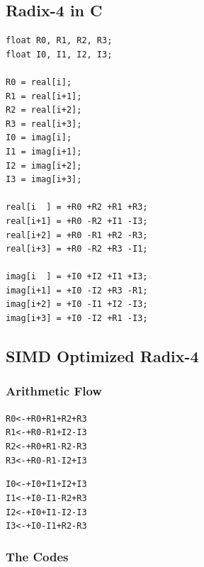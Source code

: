 \documentclass[a4paper]{report}
\begin{document}
\subsection{Radix-4 in C} \indent

    \lstset{language = c, tabsize = 4}
    \begin{lstlisting}
float R0, R1, R2, R3;
float I0, I1, I2, I3;

R0 = real[i];
R1 = real[i+1];
R2 = real[i+2];
R3 = real[i+3];
I0 = imag[i];
I1 = imag[i+1];
I2 = imag[i+2];
I3 = imag[i+3];

real[i  ] = +R0 +R2 +R1 +R3;
real[i+1] = +R0 -R2 +I1 -I3;
real[i+2] = +R0 -R1 +R2 -R3;
real[i+3] = +R0 -R2 +R3 -I1;

imag[i  ] = +I0 +I2 +I1 +I3;
imag[i+1] = +I0 -I2 +R3 -R1;
imag[i+2] = +I0 -I1 +I2 -I3;
imag[i+3] = +I0 -I2 +R1 -I3;
    \end{lstlisting}

\subsection{SIMD Optimized Radix-4} \indent

\subsubsection{Arithmetic Flow} \indent

\begin{alltt}
\centering
R0 <- +R0 +R1 +R2 +R3
R1 <- +R0 -R1 +I2 -I3
R2 <- +R0 +R1 -R2 -R3
R3 <- +R0 -R1 -I2 +I3

I0 <- +I0 +I1 +I2 +I3
I1 <- +I0 -I1 -R2 +R3
I2 <- +I0 +I1 -I2 -I3
I3 <- +I0 -I1 +R2 -R3
\end{alltt}

\subsubsection{The Codes} \indent
\end{document}
